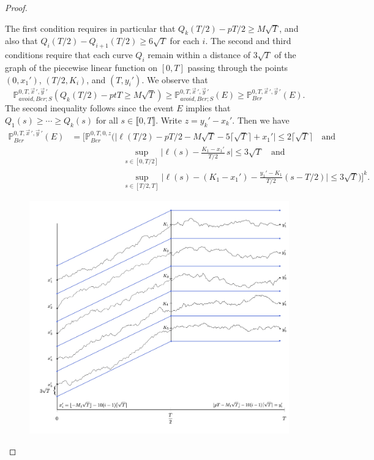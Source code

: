 \begin{proof}
\begin{enumerate}[label=(\arabic*)]
	\end{enumerate}
	The first condition requires in particular that $Q_k(T/2)-pT/2 \geq M\sqrt{T}$, and also that $Q_i(T/2)-Q_{i+1}(T/2)\geq 6\sqrt{T}$ for each $i$. The second and third conditions require that each curve $Q_i$ remain within a distance of $3\sqrt{T}$ of the graph of the piecewise linear function on $[0,T]$ passing through the points $(0,x_1')$, $(T/2,K_i)$, and $(T,y_i')$. We observe that
	\[
	\mathbb{P}^{0,T,\vec{x}\,',\vec{y}\,'}_{avoid, Ber; S} \left(Q_k(T/2) - ptT \geq M\sqrt{T}\right) \geq \mathbb{P}^{0,T,\vec{x}\,',\vec{y}\,'}_{avoid, Ber; S}(E) \geq \mathbb{P}^{0,T,\vec{x}\,',\vec{y}\,'}_{Ber}(E).
	\]
	The second inequality follows since the event $E$ implies that $Q_1(s)\geq\cdots\geq Q_k(s)$ for all $s\in\llbracket 0,T \rrbracket$. Write $z=y_k'-x_k'$. Then we have
	\begin{equation}\label{19gibbs}
	\begin{split}
	\mathbb{P}^{0,T,\vec{x}\,',\vec{y}\,'}_{Ber}(E) &= \Big[\mathbb{P}^{0,T,0,z}_{Ber}\Big(\big|\ell(T/2)-pT/2-M\sqrt{T}-5\lceil\sqrt{T}\rceil+x_1'\big|\leq 2\lceil\sqrt{T}\rceil \quad\mathrm{and}\\
	&\qquad\qquad\qquad \sup_{s\in[0,T/2]}\Big|\ell(s) - \frac{K_1-x_1'}{T/2}\,s\Big| \leq 3\sqrt{T}\quad\mathrm{and}\\
	&\qquad\qquad\qquad \sup_{s\in[T/2,T]}\Big|\ell(s)-(K_1-x_1')-\frac{y_1'-K_1}{T/2}(s-T/2)\Big| \leq 3\sqrt{T}\Big) \Big]^k.
	\end{split}
	\end{equation}
\begin{figure}
	\includegraphics[scale=0.6]{graphics/Lemma320.jpg}

\end{figure}
\end{proof}
